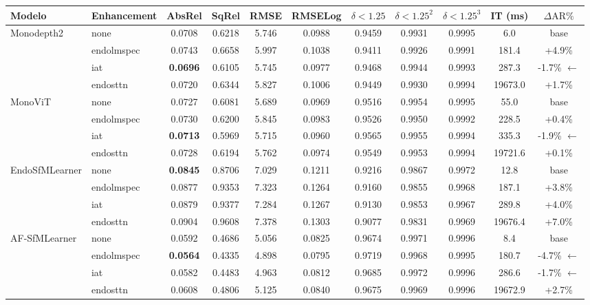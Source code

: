 \documentclass{article}
\begin{document}
\begin{table}[htbp]
\begin{tabular}{llccccccccc}
\toprule
\textbf{Modelo} & \textbf{Enhancement} & \textbf{AbsRel} & \textbf{SqRel} & \textbf{RMSE} & \textbf{RMSELog} & $\delta < 1.25$ & $\delta < 1.25^2$ & $\delta < 1.25^3$ & \textbf{IT (ms)} & $\Delta\text{AR}\%$ \\
\midrule
\multirow{4}{*}{Monodepth2}
 & none & 0.0708 & 0.6218 & 5.746 & 0.0988 & 0.9459 & 0.9931 & 0.9995 & 6.0 & base \\
 & endolmspec & 0.0743 & 0.6658 & 5.997 & 0.1038 & 0.9411 & 0.9926 & 0.9991 & 181.4 & +4.9\% \\
 & iat & \textbf{0.0696} & 0.6105 & 5.745 & 0.0977 & 0.9468 & 0.9944 & 0.9993 & 287.3 & -1.7\% $\leftarrow$ \\
 & endosttn & 0.0720 & 0.6344 & 5.827 & 0.1006 & 0.9449 & 0.9930 & 0.9994 & 19673.0 & +1.7\% \\
\midrule
\multirow{4}{*}{MonoViT}
 & none & 0.0727 & 0.6081 & 5.689 & 0.0969 & 0.9516 & 0.9954 & 0.9995 & 55.0 & base \\
 & endolmspec & 0.0730 & 0.6200 & 5.845 & 0.0983 & 0.9526 & 0.9950 & 0.9992 & 228.5 & +0.4\% \\
 & iat & \textbf{0.0713} & 0.5969 & 5.715 & 0.0960 & 0.9565 & 0.9955 & 0.9994 & 335.3 & -1.9\% $\leftarrow$ \\
 & endosttn & 0.0728 & 0.6194 & 5.762 & 0.0974 & 0.9549 & 0.9953 & 0.9994 & 19721.6 & +0.1\% \\
\midrule
\multirow{4}{*}{EndoSfMLearner}
 & none & \textbf{0.0845} & 0.8706 & 7.029 & 0.1211 & 0.9216 & 0.9867 & 0.9972 & 12.8 & base \\
 & endolmspec & 0.0877 & 0.9353 & 7.323 & 0.1264 & 0.9160 & 0.9855 & 0.9968 & 187.1 & +3.8\% \\
 & iat & 0.0879 & 0.9377 & 7.284 & 0.1267 & 0.9130 & 0.9853 & 0.9967 & 289.8 & +4.0\% \\
 & endosttn & 0.0904 & 0.9608 & 7.378 & 0.1303 & 0.9077 & 0.9831 & 0.9969 & 19676.4 & +7.0\% \\
\midrule
\multirow{4}{*}{AF-SfMLearner}
 & none & 0.0592 & 0.4686 & 5.056 & 0.0825 & 0.9674 & 0.9971 & 0.9996 & 8.4 & base \\
 & endolmspec & \textbf{0.0564} & 0.4335 & 4.898 & 0.0795 & 0.9719 & 0.9968 & 0.9995 & 180.7 & -4.7\% $\leftarrow$ \\
 & iat & 0.0582 & 0.4483 & 4.963 & 0.0812 & 0.9685 & 0.9972 & 0.9996 & 286.6 & -1.7\% $\leftarrow$ \\
 & endosttn & 0.0608 & 0.4806 & 5.125 & 0.0840 & 0.9675 & 0.9969 & 0.9996 & 19672.9 & +2.7\% \\

\end{tabular}
\end{table}
\end{document}
